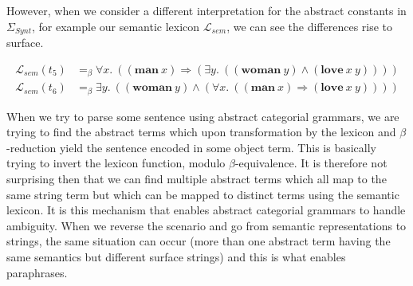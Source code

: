 However, when we consider a different interpretation for the abstract
constants in $\Sigma_{Synt}$, for example our semantic lexicon
$\mathcal{L}_{sem}$, we can see the differences rise to surface.

\begin{align*}
\mathcal{L}_{sem}(t_5) &=_{\beta} \forall x.\ ((\textbf{man}\ x)
\Rightarrow (\exists y.\ ((\textbf{woman}\ y) \land
(\textbf{love}\ x\ y)))) \\
\mathcal{L}_{sem}(t_6) &=_{\beta} \exists y.\ ((\textbf{woman}\ y)
\land (\forall x.\ ((\textbf{man}\ x) \Rightarrow
(\textbf{love}\ x\ y))))
\end{align*}

When we try to parse some sentence using abstract categorial grammars,
we are trying to find the abstract terms which upon transformation by
the lexicon and $\beta$-reduction yield the sentence encoded in some
object term. This is basically trying to invert the lexicon function,
modulo $\beta$-equivalence. It is therefore not surprising then that we
can find multiple abstract terms which all map to the same string term
but which can be mapped to distinct terms using the semantic lexicon. It
is this mechanism that enables abstract categorial grammars to handle
ambiguity. When we reverse the scenario and go from semantic
representations to strings, the same situation can occur (more than one
abstract term having the same semantics but different surface strings)
and this is what enables paraphrases.
